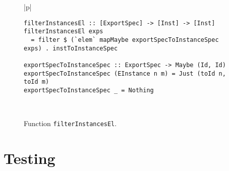 \documentclass[msc]{ppgccufmg}
\begin{document}
\begin{figure}
\caption{Function \texttt{filterInstancesEl}.\label{filterInstancesEl}}
\begin{tabular}{|p{\textwidth}|}
\hline
\begin{verbatim}
filterInstancesEl :: [ExportSpec] -> [Inst] -> [Inst]
filterInstancesEl exps
  = filter $ (`elem` mapMaybe exportSpecToInstanceSpec exps) . instToInstanceSpec

exportSpecToInstanceSpec :: ExportSpec -> Maybe (Id, Id)
exportSpecToInstanceSpec (EInstance n m) = Just (toId n, toId m)
exportSpecToInstanceSpec _ = Nothing
\end{verbatim}
\\
\hline
\end{tabular}
\end{figure}

\section{Testing}
\end{document}
